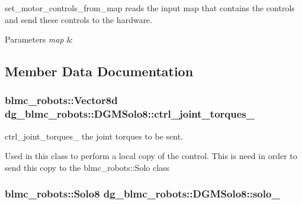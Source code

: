 set\+\_\+motor\+\_\+controls\+\_\+from\+\_\+map reads the input map that contains the controls and send these controls to the hardware. 


\begin{DoxyParams}{Parameters}
{\em map} & \\
\hline
\end{DoxyParams}


\subsection{Member Data Documentation}
\subsubsection[{\texorpdfstring{ctrl\+\_\+joint\+\_\+torques\+\_\+}{ctrl_joint_torques_}}]{\setlength{\rightskip}{0pt plus 5cm}blmc\+\_\+robots\+::\+Vector8d dg\+\_\+blmc\+\_\+robots\+::\+D\+G\+M\+Solo8\+::ctrl\+\_\+joint\+\_\+torques\+\_\+\hspace{0.3cm}{\ttfamily [private]}}\hypertarget{classdg__blmc__robots_1_1DGMSolo8_a81971c21240a172c936c56cdfbf0a02c}{}\label{classdg__blmc__robots_1_1DGMSolo8_a81971c21240a172c936c56cdfbf0a02c}


ctrl\+\_\+joint\+\_\+torques\+\_\+ the joint torques to be sent. 

Used in this class to perform a local copy of the control. This is need in order to send this copy to the blmc\+\_\+robots\+::\+Solo class 
\subsubsection[{\texorpdfstring{solo\+\_\+}{solo_}}]{\setlength{\rightskip}{0pt plus 5cm}blmc\+\_\+robots\+::\+Solo8 dg\+\_\+blmc\+\_\+robots\+::\+D\+G\+M\+Solo8\+::solo\+\_\+\hspace{0.3cm}{\ttfamily [private]}}\hypertarget{classdg__blmc__robots_1_1DGMSolo8_a65ce342929838851ee3fe9f0f9633088}{}\label{classdg__blmc__robots_1_1DGMSolo8_a65ce342929838851ee3fe9f0f9633088}


